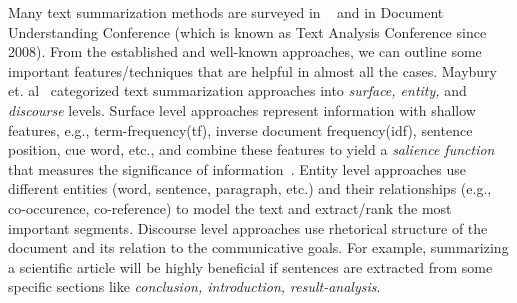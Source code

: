 \documentclass[a4paper]{report}
\begin{document}
\par Many text summarization methods are surveyed in ~\cite{DBLP:conf/acl/ManiM01, Maybury:1999:AAT:554275} and in Document Understanding Conference (which is known as Text Analysis Conference since 2008). From the established and well-known approaches, we can  outline some important features/techniques that are helpful in almost all the cases. Maybury et. al~\cite{Maybury:1999:AAT:554275} categorized text summarization approaches into \emph{surface, entity,} and \emph{discourse} levels. Surface level approaches represent information with shallow features, e.g., term-frequency(tf), inverse document frequency(idf), sentence position, cue word, etc., and combine these features to yield a \emph{salience function} that measures the significance of information~\cite{Yeh:2005:TSU:1041178.1041184}. Entity level approaches use different entities (word, sentence, paragraph, etc.) and their relationships  (e.g., co-occurence, co-reference) to model the text and extract/rank the most important segments. Discourse level approaches use rhetorical structure of the document and its relation to the communicative goals. For example, summarizing a scientific article will be highly beneficial if sentences are extracted from some specific sections like \emph{conclusion, introduction, result-analysis}.\\

\end{document}
